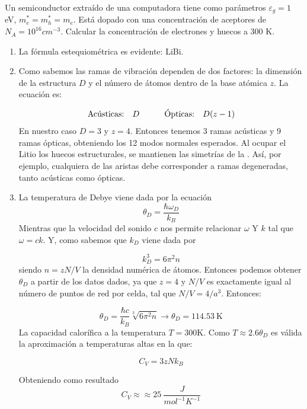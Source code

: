 \begin{ejercicio}
	Un semiconductor extraído de una computadora tiene como parámetros $\varepsilon_g = 1$ eV, $m_e^* = m_h^* = m_e$. Está dopado con una concentración de aceptores de $N_A = 10^{16} \unit{cm}^{-3}$. Calcular la concentración de electrones y huecos a 300 K. 
\end{ejercicio}	


\begin{solucion}
	\begin{enumerate}[label=\alph*)]
		\item La fórmula estequiométrica es evidente: LiBi.
		\item Como sabemos las ramas de vibración dependen de dos factores: la dimensión de la estructura $D$ y el número de átomos dentro de la base atómica $z$. La ecuación es:
		
		\begin{equation}
			\text{Acústicas:} \quad D  \quad \quad \quad
			\text{Ópticas:} \quad D(z-1)
		\end{equation}
		En nuestro caso $D=3$ y $z=4$. Entonces tenemos 3 ramas acústicas y 9 ramas ópticas, obteniendo los 12 modos normales esperados. Al ocupar el Litio los huecos estructurales, se mantienen las simetrías de la \fcc. Así, por ejemplo, cualquiera de las aristas debe corresponder a ramas degeneradas, tanto acústicas como ópticas.
		
		\item La temperatura de Debye viene dada por la ecuación
		\begin{equation*}
			\theta_D= \frac{\hbar \omega_D}{k_B}
		\end{equation*}
		Mientras que la velocidad del sonido $c$ nos permite relacionar $\omega$ Y $k$ tal que $\omega = c k$. Y, como sabemos que $k_D$ viene dada por
		
		\begin{equation*}
			k_D^3 = 6 \pi^2 n
		\end{equation*}
		siendo $n=zN/V$ la densidad numérica de átomos. Entonces podemos obtener $\theta_D$ a partir de los datos dados, ya que $z=4$ y $N/V$ es exactamente igual al número de puntos de red por celda, tal que $N/V=4/a^3$. Entonces:
		
		\begin{equation*}
			\theta_D = \frac{\hbar c}{k_B} \sqrt[3]{6\pi^2 n} \longrightarrow \theta_D = 114.53 \ \text{K}
		\end{equation*}
		La capacidad calorífica a la temperatura $T=300$K. Como $T\approx 2.6 \theta_D$ es válida la aproximación a temperaturas altas en la que:
		
		\begin{equation}
			C_V=3zNk_B
		\end{equation}
		 
		Obteniendo como resultado
		\begin{equation*}
			C_V \approx  \approx 25\ \unit{\frac{J}{mol^{-1} K^{-1}}}
		\end{equation*} 
		
	\end{enumerate}
	
\end{solucion}	

